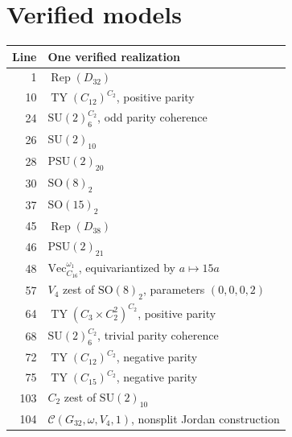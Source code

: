 \documentclass[11pt,a4paper]{article}
\begin{document}
\clearpage\section{Verified models}\small\begin{longtable}{r p{}}\toprule Line & One verified realization\\\midrule\endhead

1 & $\operatorname{Rep}(D_{32})$\\[3pt]

10 & $\operatorname{TY}(C_{12})^{C_2}$, positive parity\\[3pt]

24 & $\mathrm{SU}(2)_6^{C_2}$, odd parity coherence\\[3pt]

26 & $\mathrm{SU}(2)_{10}$\\[3pt]

28 & $\mathrm{PSU}(2)_{20}$\\[3pt]

30 & $\mathrm{SO}(8)_2$\\[3pt]

37 & $\mathrm{SO}(15)_2$\\[3pt]

45 & $\operatorname{Rep}(D_{38})$\\[3pt]

46 & $\mathrm{PSU}(2)_{21}$\\[3pt]

48 & $\mathrm{Vec}_{C_{16}}^{\omega_1}$, equivariantized by $a\mapsto15a$\\[3pt]

57 & $V_4$ zest of $\mathrm{SO}(8)_2$, parameters $(0,0,0,2)$\\[3pt]

64 & $\operatorname{TY}(C_3\times C_2^2)^{C_2}$, positive parity\\[3pt]

68 & $\mathrm{SU}(2)_6^{C_2}$, trivial parity coherence\\[3pt]

72 & $\operatorname{TY}(C_{12})^{C_2}$, negative parity\\[3pt]

75 & $\operatorname{TY}(C_{15})^{C_2}$, negative parity\\[3pt]

103 & $C_2$ zest of $\mathrm{SU}(2)_{10}$\\[3pt]

104 & $\mathcal C(G_{32},\omega,V_4,1)$, nonsplit Jordan construction\\[3pt]


\end{longtable}
\end{document}
